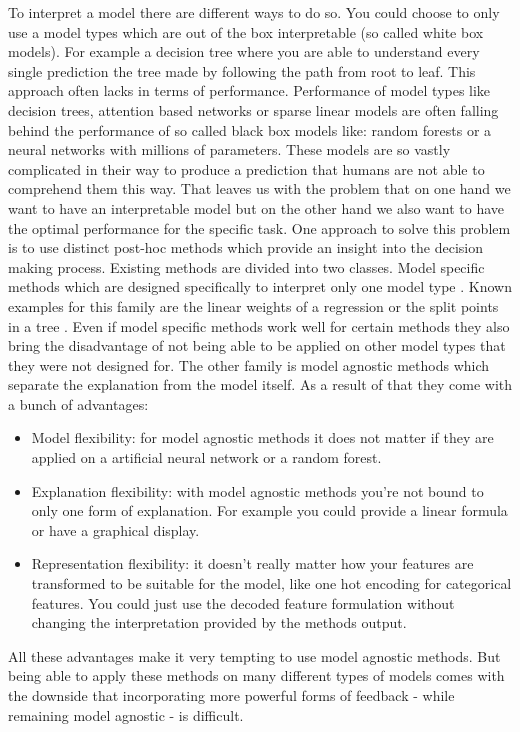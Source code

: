 \documentclass[11pt,
  a4paper,
  parskip=half, %
  BCOR=10mm, %
  english,
  ]{article}
\begin{document}
To interpret a model there are different ways to do so. You could choose to only use a model types which are out of the box interpretable (so called white box models). For example a decision tree where you are able to understand every single prediction the tree made by following the path from root to leaf.
This approach often lacks in terms of performance. Performance of model types like decision trees, attention based networks or sparse linear models are often falling behind the performance of so called black box models like:
random forests or a neural networks with millions of parameters. These models are so vastly complicated in their way to produce a prediction that humans are not able to comprehend them this way. 
That leaves us with the problem that on one hand we want to have an interpretable model but on the other hand we also want to have the optimal performance for the specific task. \cite{molnar2022}
One approach to solve this problem is to use distinct post-hoc methods which provide an insight into the decision making process. Existing methods are divided into two classes. Model specific methods which are 
designed specifically to interpret only one model type \cite{molnar2022}. Known examples for this family are the linear weights of a regression or the split points in a tree \cite{molnar2022}. Even if model specific methods work well for certain methods they 
also bring the disadvantage of not being able to be applied on other model types that they were not designed for. The other family is model agnostic methods which separate the explanation from the model itself. As a result of that they come with a bunch of advantages:
\begin{itemize} 
    \item Model flexibility: for model agnostic methods it does not matter if they are applied on a artificial neural network or a random forest. \cite{modelAgnostic}
    \item Explanation flexibility: with model agnostic methods you're not bound to only one form of explanation. For example you could provide a linear formula or have a graphical display. \cite{modelAgnostic}
    \item Representation flexibility: it doesn't really matter how your features are transformed to be suitable for the model, like one hot encoding for categorical features. You could just use the decoded feature 
    formulation without changing the interpretation provided by the methods output. \cite{modelAgnostic}
\end{itemize}
All these advantages make it very tempting to use model agnostic methods.
But being able to apply these methods on many different types of models comes with the downside that incorporating more powerful forms of feedback
- while remaining model agnostic - is difficult\cite{molnar2022}. 
\end{document}
